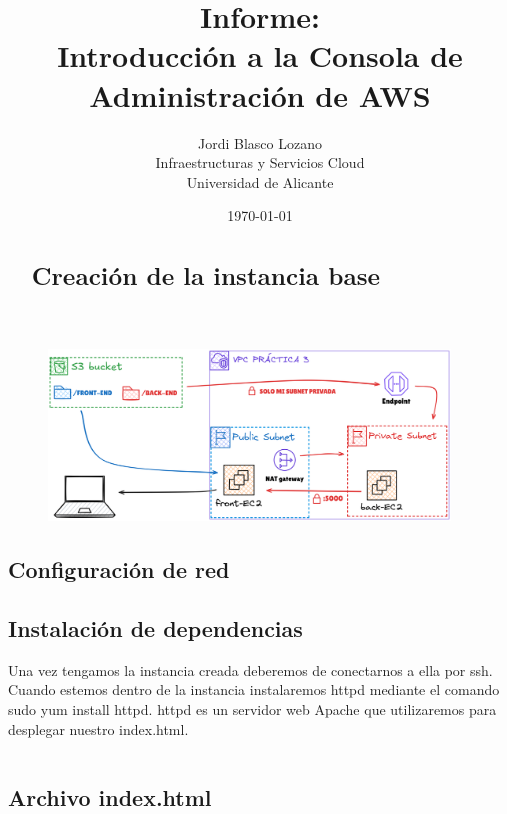 \documentclass{article}
\title{Informe: \\ Introducción a la Consola de Administración de AWS}
\author{
	Jordi Blasco Lozano \\
	\small Infraestructuras y Servicios Cloud \\
	\small Universidad de Alicante
}
\date{\today}
\begin{document}
	
	\maketitle

	\begin{abstract}
	\noindent 
	

	\tableofcontents

	\newpage

	\section{Creación de la instancia base}

	\end{abstract}
	\begin{figure}[H]
	\centering
	\includegraphics[width=0.95\textwidth]{esquema.png}
	\end{figure}

		

	\subsection{Configuración de red}

		
	
\newpage

	\subsection{Instalación de dependencias}

		Una vez tengamos la instancia creada deberemos de conectarnos a ella por ssh. Cuando estemos dentro de la instancia instalaremos httpd mediante el comando sudo yum install httpd. httpd es un servidor web Apache que utilizaremos para desplegar nuestro index.html.


\begin{lstlisting}[style=consola, language=bash, caption={Terminal, dependencias}]


\end{lstlisting}

\subsection{Archivo index.html}


\newpage
\end{document}
